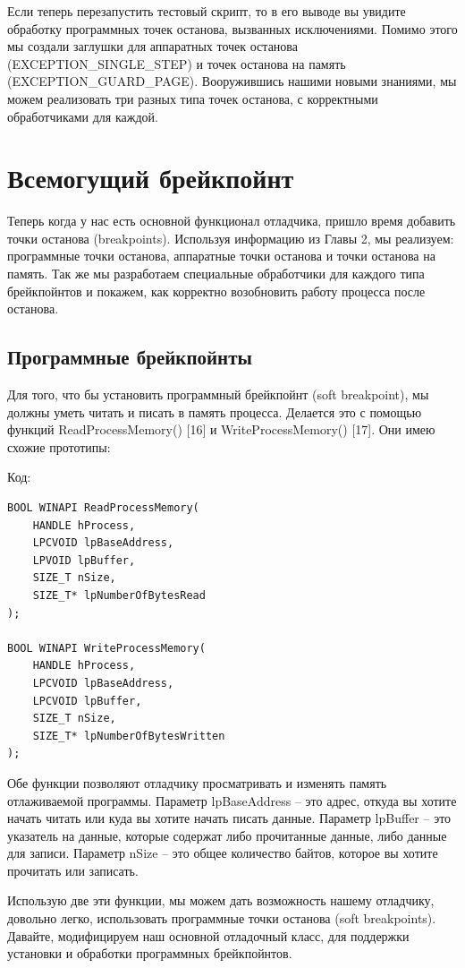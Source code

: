 \documentclass[12pt, a4paper, oneside]{book}
\begin{document}
Если теперь перезапустить тестовый скрипт, то в его выводе вы увидите обработку программных точек останова, вызванных исключениями. Помимо этого мы создали заглушки для аппаратных точек останова (EXCEPTION\_SINGLE\_STEP) и точек останова на память (EXCEPTION\_GUARD\_PAGE). Вооружившись нашими новыми знаниями, мы можем реализовать три разных типа точек останова, с корректными обработчиками для каждой.

\section{Всемогущий брейкпойнт}

Теперь когда у нас есть основной функционал отладчика, пришло время добавить точки останова (breakpoints). Используя информацию из Главы 2, мы реализуем: программные точки останова, аппаратные точки останова и точки останова на память. Так же мы разработаем специальные обработчики для каждого типа брейкпойнтов и покажем, как корректно возобновить работу процесса после останова.

\subsection{Программные брейкпойнты}

Для того, что бы установить программный брейкпойнт (soft breakpoint), мы должны уметь читать и писать в память процесса. Делается это с помощью функций ReadProcessMemory() [16] и WriteProcessMemory() [17]. Они имею схожие прототипы:

Код:
\begin{verbatim}
BOOL WINAPI ReadProcessMemory(
    HANDLE hProcess,
    LPCVOID lpBaseAddress,
    LPVOID lpBuffer,
    SIZE_T nSize,
    SIZE_T* lpNumberOfBytesRead
);

BOOL WINAPI WriteProcessMemory(
    HANDLE hProcess,
    LPCVOID lpBaseAddress,
    LPCVOID lpBuffer,
    SIZE_T nSize,
    SIZE_T* lpNumberOfBytesWritten
);
\end{verbatim}

Обе функции позволяют отладчику просматривать и изменять память отлаживаемой программы. Параметр lpBaseAddress – это адрес, откуда вы хотите начать читать или куда вы хотите начать писать данные. Параметр lpBuffer – это указатель на данные, которые содержат либо прочитанные данные, либо данные для записи. Параметр nSize – это общее количество байтов, которое вы хотите прочитать или записать.

Использую две эти функции, мы можем дать возможность нашему отладчику, довольно легко, использовать программные точки останова (soft breakpoints). Давайте, модифицируем наш основной отладочный класс, для поддержки установки и обработки программных брейкпойнтов. 
\end{document}
